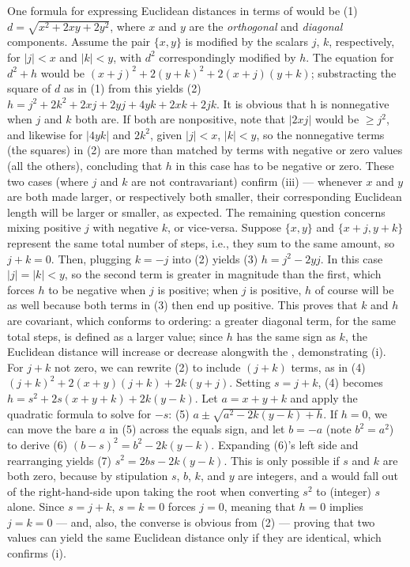 One formula for expressing Euclidean distances 
in terms of \MCH{} would be (1) $d = \sqrt{x^2 + 2xy + 2y^2}$, 
where $x$ and $y$ are the \MCH{} \textit{orthogonal} 
and \textit{diagonal} components.   
Assume the pair $\{x, y\}$ is modified by the 
scalars $j$, $k$, respectively, for $|j| < x$ and $|k| < y$, 
with $d^2$ correspondingly 
modified by $h$.  The equation for $d^2 + h$ would be 
$(x + j)^2 + 2(y + k)^2 + 2(x + j)(y + k)$; substracting the 
square of $d$ as in (1) from this 
yields (2) $h = j^2 + 2k^2 + 2xj + 2yj + 4yk +2xk + 2jk$.  
It is obvious that h is nonnegative when $j$ and $k$ 
both are.  If both are nonpositive, note that 
$|2xj|$ would be $\geq{}j^2$, and likewise 
for $|4yk|$ and $2k^2$, given $|j| < x$, $|k| < y$, 
so the nonnegative terms (the squares) in (2) are more than 
matched by terms with negative or zero values (all the others), 
concluding that $h$ in this case has to be negative or zero.  
These two cases (where $j$ and $k$ are not contravariant) 
confirm (iii) ---  whenever $x$ and $y$ are both made larger, or 
respectively both smaller, their corresponding Euclidean 
length will be larger or smaller, as expected.  
The remaining question concerns mixing positive $j$ with negative $k$, 
or vice-versa.  Suppose $\{x, y\}$ and $\{x + j, y + k\}$ represent 
the same total number of steps, i.e., they sum 
to the same amount, so $j + k = 0$.  Then, plugging 
$k = -j$ into (2) yields (3) $h = j^2 - 2yj$.  
In this case $|j| = |k| < y$, so the second 
term is greater in magnitude than the first, which 
forces $h$ to be negative when $j$ is positive; 
when $j$ is positive, $h$ of course will be as well 
because both terms in (3) then end up positive.  
This proves that $k$ and $h$ are covariant, which 
conforms to \MCH{} ordering: a greater diagonal term, 
for the same total steps, is defined as a larger 
\MCH{} value; since $h$ has the same sign as $k$, 
the Euclidean distance will increase or decrease alongwith 
the \MCH{}, demonstrating (i).  
For $j + k$ not zero, we can rewrite (2) to include 
$(j + k)$ terms, as in (4) $(j + k)^2 + 2(x + y)(j + k) + 2k(y + j)$.
Setting $s = j + k$, (4) becomes $h = s^2 + 2s(x+y+k) + 2k(y - k)$.
Let $a = x+y+k$ and apply the quadratic formula to solve for 
$-s$: (5) $a \pm{} \sqrt{a^2-2k(y-k)+h}$.  If $h = 0$, we can move the bare $a$ 
in (5) across the equals sign, and let $b = -a$ (note $b^2=a^2$) 
to derive (6) $(b-s)^2=b^2-2k(y-k)$.  Expanding (6)'s left side 
and rearranging yields (7) $s^2=2bs-2k(y-k)$.  This is only possible 
if $s$ and $k$ are both zero, because by stipulation $s$, $b$, $k$, and 
$y$ are integers, and a  would fall out of the right-hand-side 
upon taking the root when converting $s^2$ to (integer) $s$ alone.  
Since $s = j + k$, $s = k = 0$ forces $j = 0$, meaning that 
$h = 0$ implies $j = k = 0$ --- and, also, 
the converse is obvious from (2) --- proving that 
two \MCH{} values can yield the same Euclidean 
distance only if they are identical, which confirms (i).   


